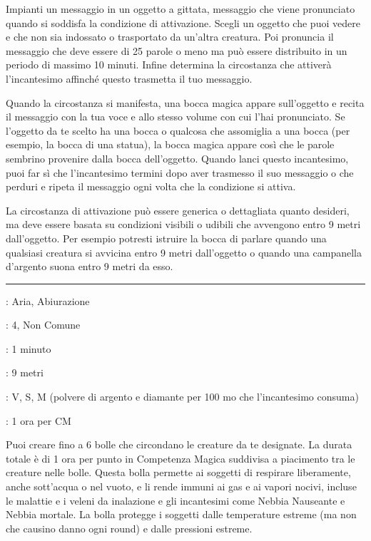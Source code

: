 \begin{multicols}{2}
Impianti un messaggio in un oggetto a gittata, messaggio che viene pronunciato quando si soddisfa la condizione di attivazione. Scegli un oggetto che puoi vedere e che non sia indossato o trasportato da un'altra creatura. Poi pronuncia il messaggio che deve essere di 25 parole o meno ma può essere distribuito in un periodo di massimo 10 minuti. Infine determina la circostanza che attiverà l'incantesimo affinché questo trasmetta il tuo messaggio.

Quando la circostanza si manifesta, una bocca magica appare sull'oggetto e recita il messaggio con la tua voce e allo stesso volume con cui l'hai pronunciato. Se l'oggetto da te scelto ha una bocca o qualcosa che assomiglia a una bocca (per esempio, la bocca di una statua), la bocca magica appare così che le parole sembrino provenire dalla bocca dell'oggetto. Quando lanci questo incantesimo, puoi far sì che l'incantesimo termini dopo aver trasmesso il suo messaggio o che perduri e ripeta il messaggio ogni volta che la condizione si attiva.

La circostanza di attivazione può essere generica o dettagliata quanto desideri, ma deve essere basata su condizioni visibili o udibili che avvengono entro 9 metri dall'oggetto. Per esempio potresti istruire la bocca di parlare quando una qualsiasi creatura si avvicina entro 9 metri dall'oggetto o quando una campanella d'argento suona entro 9 metri da esso.

\smallskip\noindent\rule{\linewidth}{2pt} \hypertarget{Bolla vitale}{}\smallskip{}
\noindent
\begin{description}[noitemsep, topsep=0pt, parsep=0pt, partopsep=0pt, leftmargin=0cm, labelwidth=2.8cm]
	\item[\textbf{Lista di Magia}]: Aria, Abiurazione
	\item[\textbf{Livello}]: 4, Non Comune
	\item[\textbf{T. di Lancio}]: 1 minuto
	\item[\textbf{Gittata}]: 9 metri
	\item[\textbf{Componenti}]: V, S, M (polvere di argento e diamante per 100 mo che l'incantesimo consuma)
	\item[\textbf{Durata}]: 1 ora per CM
\end{description}

Puoi creare fino a 6 bolle che circondano le creature da te designate.
La durata totale è di 1 ora per punto in Competenza Magica suddivisa a piacimento tra le creature nelle bolle.
Questa bolla permette ai soggetti di respirare liberamente, anche sott'acqua o nel vuoto, e li rende immuni ai gas e ai vapori nocivi, incluse le malattie e i veleni da inalazione e gli incantesimi come Nebbia Nauseante e Nebbia mortale. La bolla protegge i soggetti dalle temperature estreme (ma non che causino danno ogni round) e dalle pressioni estreme.


\end{multicols}
